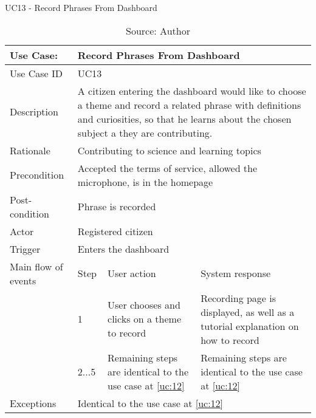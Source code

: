 \begin{table}[h]
\centering
\caption{UC13 - Record Phrases From Dashboard}
\label{uc:13}
\begin{tabular}{|p{3cm}|p{1cm}|p{5cm}|p{5cm}|}
\hline
Use Case:       & \multicolumn{3}{p{11cm}|}{Record Phrases From Dashboard} \\ \hline
Use Case ID     & \multicolumn{3}{p{11cm}|}{UC13} \\ \hline
Description     & \multicolumn{3}{p{11cm}|}{A citizen entering the dashboard would like to choose a theme and record a related phrase with definitions and curiosities, so that he learns about the chosen subject a they are contributing.} \\ \hline
Rationale       & \multicolumn{3}{p{11cm}|}{Contributing to science and learning topics} \\ \hline
Precondition    & \multicolumn{3}{p{11cm}|}{Accepted the terms of service, allowed the microphone, is in the homepage} \\ \hline
Post-condition  & \multicolumn{3}{p{11cm}|}{Phrase is recorded} \\ \hline
Actor           & \multicolumn{3}{p{11cm}|}{Registered citizen} \\ \hline
Trigger         & \multicolumn{3}{p{11cm}|}{Enters the dashboard} \\ \hline
Main flow of events & Step  & User action & System response \\ \hline
                    & 1     & User chooses and clicks on a theme to record & Recording page is displayed, as well as a tutorial explanation on how to record \\ \hline
                    & 2...5     & Remaining steps are identical to the use case at \ref{uc:12} & Remaining steps are identical to the use case at \ref{uc:12} \\ \hline
Exceptions      & \multicolumn{3}{p{11cm}|}{Identical to the use case at \ref{uc:12}} \\ \hline
\end{tabular}
\caption*{Source: Author}
\end{table}

